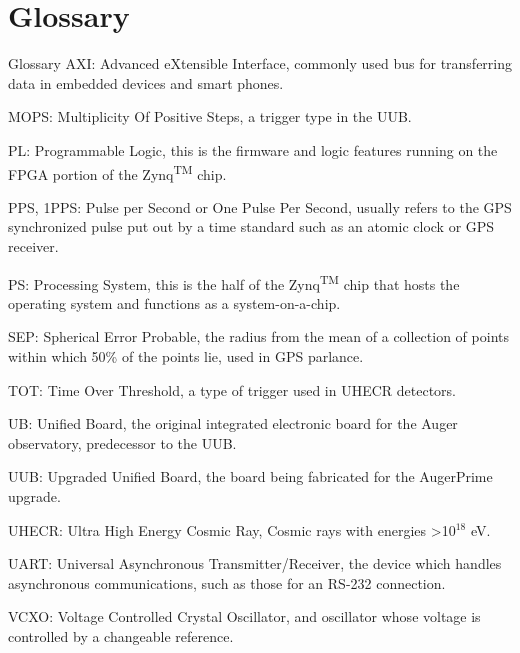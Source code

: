 \chapter{Glossary}\label{glossary}
Glossary
AXI: Advanced eXtensible Interface, commonly used bus for transferring data in embedded devices and smart phones.

MOPS: Multiplicity Of Positive Steps, a trigger type in the UUB.

PL: Programmable Logic, this is the firmware and logic features running on the FPGA portion of the Zynq\textsuperscript{TM} chip.

PPS, 1PPS: Pulse per Second or One Pulse Per Second, usually refers to the GPS synchronized pulse put out by a time standard such as an atomic clock or GPS receiver.

PS: Processing System, this is the half of the Zynq\textsuperscript{TM} chip that hosts the operating system and functions as a system-on-a-chip.

SEP: Spherical Error Probable, the radius from the mean of a collection of points within which 50\% of the points lie, used in GPS parlance.

TOT: Time Over Threshold, a type of trigger used in UHECR detectors.

UB: Unified Board, the original integrated electronic board for the Auger observatory, predecessor to the UUB.

UUB: Upgraded Unified Board, the board being fabricated for the AugerPrime upgrade. 

UHECR: Ultra High Energy Cosmic Ray, Cosmic rays with energies \textgreater 10$^{18}$ eV.

UART: Universal Asynchronous Transmitter/Receiver, the device which handles asynchronous communications, such as those for an RS-232 connection.

VCXO: Voltage Controlled Crystal Oscillator, and oscillator whose voltage is controlled by a changeable reference.



